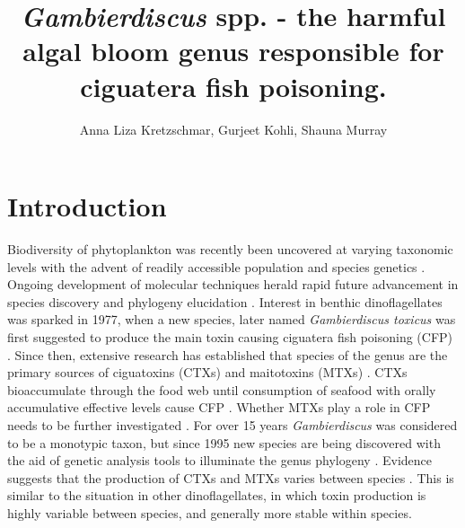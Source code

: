 \documentclass[12pt]{article}
\title{\textbf{ \emph{Gambierdiscus} spp. - the harmful algal bloom genus responsible for ciguatera fish poisoning.}}
\author{Anna Liza Kretzschmar, Gurjeet Kohli, Shauna Murray}
\date{}
\begin{document}
\maketitle
\section{Introduction}
Biodiversity of phytoplankton was recently been uncovered at varying taxonomic levels with the advent of readily accessible population and species genetics \cite{simon2009diversity}. Ongoing development of molecular techniques herald rapid future advancement in species discovery and phylogeny elucidation \cite{murray2012genetic,murray2012transcriptomics}.
Interest in benthic dinoflagellates was sparked in 1977, when a new species, later named \emph{Gambierdiscus toxicus} was first suggested to produce the main toxin causing ciguatera fish poisoning (CFP) \cite{yasumoto1977finding}.  
Since then, extensive research has established that species of the genus are the primary sources of ciguatoxins (CTXs) and maitotoxins (MTXs) \cite{chinain1997intraspecific,holmes1998gambierdiscus}. CTXs bioaccumulate through the food web until consumption of seafood with orally accumulative effective levels cause CFP \cite{bagnis1979clinical,gillespie1987possible,sims1987theoretical}. Whether MTXs play a role in CFP needs to be further investigated \cite{kohli2014feeding}. For over 15 years \emph{Gambierdiscus} was considered to be a monotypic taxon, but since 1995 new species are being discovered with the aid of genetic analysis tools to illuminate the genus phylogeny \cite{faust1995observation,holmes1998gambierdiscus,litaker2009taxonomy,chinain1999morphology,fraga2011gambierdiscus,nishimura2014morphology}. Evidence suggests that the production of CTXs and MTXs varies between species \cite{chinain2010growth,holland2013differences}. This is similar to the situation in other dinoflagellates, in which toxin production is highly variable between species, and generally more stable within species.
\end{document}
